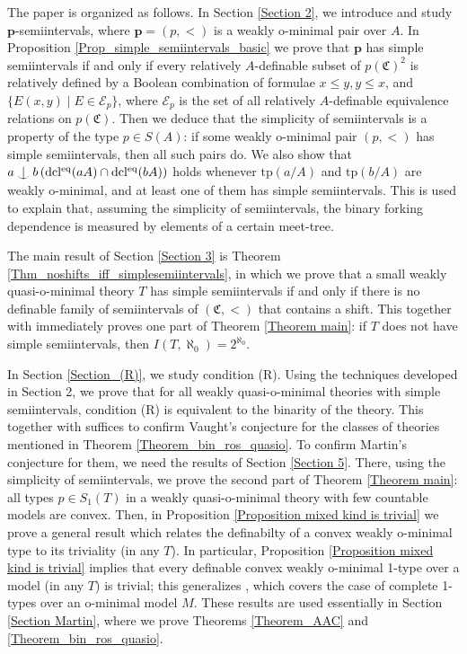 \documentclass{amsart}
\theoremstyle{definition}
\theoremstyle{definition}
\def\Ind#1#2{#1\setbox0=\hbox{$#1x$}\kern\wd0\hbox to 0pt{\hss$#1\mid$\hss}
\lower.9\ht0\hbox to 0pt{\hss$#1\smile$\hss}\kern\wd0}
\def\ind{\mathop{\mathpalette\Ind{}}}
\newcommand{\Mon}{\mathfrak C}
\newcommand{\tp}{\mathrm{tp}}
\newcommand{\dcleq}{\mathrm{dcl^{eq}}}
\begin{document}
\smallskip 
The paper is organized as follows. 
In Section \ref{Section 2}, we introduce and study $\mathbf p$-semiintervals, where $\mathbf p=(p,<)$ is a weakly o-minimal pair over $A$. 
In Proposition \ref{Prop_simple_semiintervals_basic} we prove that $\mathbf p$ has simple semiintervals if and only if every relatively $A$-definable subset of $p(\Mon)^2$ is relatively defined by a Boolean combination of formulae $x\leqslant y, y\leqslant x$, and $\{E(x,y)\mid E\in \mathcal E_p\}$,  where $\mathcal E_p$ is the set of all relatively $A$-definable equivalence relations on $p(\Mon)$. Then we deduce that the simplicity of semiintervals is a property of the type $p\in S(A)$: if some weakly o-minimal pair $(p,<)$ has simple semiintervals, then all such pairs do. We also show that $a\ind b\,({\dcleq(aA)\cap \dcleq(bA)})$ holds whenever $\tp(a/A)$ and $\tp(b/A)$ are weakly o-minimal, and at least one of them has simple semiintervals. This is used to explain that, assuming the simplicity of semiintervals, the binary forking dependence is measured by elements of a certain meet-tree.

The main result of Section \ref{Section 3} is Theorem \ref{Thm_noshifts_iff_simplesemiintervals}, in which we prove that a small weakly quasi-o-minimal theory $T$ has simple semiintervals if and only if there is no definable family of semiintervals of $(\Mon,<)$ that contains a shift. This together with \cite[Theorem 1]{MTwqom1} immediately proves one part of Theorem \ref{Theorem main}: if $T$ does not have simple semiintervals, then $I(T,\aleph_0)=2^{\aleph_0}$.

In Section \ref{Section_(R)}, we study condition (R). Using the techniques developed in Section 2, we prove that for all weakly quasi-o-minimal theories with simple semiintervals, condition (R) is equivalent to the binarity of the theory. This together with \cite[Theorem 1]{MT} suffices to confirm Vaught's conjecture for the classes of theories mentioned in Theorem \ref{Theorem_bin_ros_quasio}. To confirm Martin's conjecture for them, we need the results of
Section \ref{Section 5}. There, using the simplicity of semiintervals, we prove the second part of Theorem \ref{Theorem main}: all types $p\in S_1(T)$ in a weakly quasi-o-minimal theory with few countable models are convex. Then, in Proposition \ref{Proposition mixed kind is trivial} we prove a general result which relates the definabilty of a convex weakly o-minimal type to its triviality (in any $T$). In particular, Proposition \ref{Proposition mixed kind is trivial} implies that every definable convex weakly o-minimal 1-type over a model (in any $T$) is trivial; this generalizes \cite[Proposition 5.18]{MTwqom1}, which covers the case of complete 1-types over an o-minimal model $M$. These results are used essentially in Section \ref{Section Martin}, where we prove Theorems \ref{Theorem_AAC} and \ref{Theorem_bin_ros_quasio}. 
\end{document}
